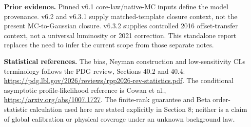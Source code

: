 \documentclass[10pt]{article}
\begin{document}
\textbf{Prior evidence.} Pinned v6.1 core-law/native-MC inputs define the model provenance. v6.2 and v6.3.1 supply matched-template closure context, not the present MC-to-Gaussian closure. v6.3.2 supplies controlled 2016 offset-transfer context, not a universal luminosity or 2021 correction. This standalone report replaces the need to infer the current scope from those separate notes.

\textbf{Statistical references.} The bias, Neyman construction and low-sensitivity CLs terminology follows the PDG review, Sections 40.2 and 40.4: \url{https://pdg.lbl.gov/2026/reviews/rpp2026-rev-statistics.pdf}. The conditional asymptotic profile-likelihood reference is Cowan et al., \url{https://arxiv.org/abs/1007.1727}. The finite-rank guarantee and Beta order-statistic calculation used here are stated explicitly in Section 8; neither is a claim of global calibration or physical coverage under an unknown background law.
\end{document}
